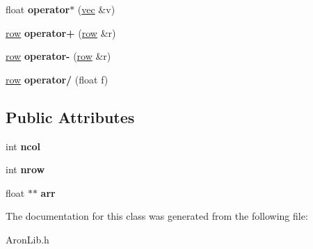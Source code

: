 \begin{DoxyCompactItemize}
\mbox{\label{class_matrix_vector_1_1row_a914ac19994185e97ee1f81e04d7b9f57}} 
float {\bfseries operator$\ast$} (\mbox{\hyperlink{class_matrix_vector_1_1vec}{vec}} \&v)
\item 
\mbox{\label{class_matrix_vector_1_1row_a48b1c08f1e5633f012a90f1165830239}} 
\mbox{\hyperlink{class_matrix_vector_1_1row}{row}} {\bfseries operator+} (\mbox{\hyperlink{class_matrix_vector_1_1row}{row}} \&r)
\item 
\mbox{\label{class_matrix_vector_1_1row_a52e6591a45962217ff4c9aa07d8abff0}} 
\mbox{\hyperlink{class_matrix_vector_1_1row}{row}} {\bfseries operator-\/} (\mbox{\hyperlink{class_matrix_vector_1_1row}{row}} \&r)
\item 
\mbox{\label{class_matrix_vector_1_1row_acb782a00f3402ab648206e27605f6ff2}} 
\mbox{\hyperlink{class_matrix_vector_1_1row}{row}} {\bfseries operator/} (float f)
\end{DoxyCompactItemize}
\subsection*{Public Attributes}
\begin{DoxyCompactItemize}
\item 
\mbox{\label{class_matrix_vector_1_1row_afee52d0d3ef890b29f1e44f51cd71eca}} 
int {\bfseries ncol}
\item 
\mbox{\label{class_matrix_vector_1_1row_a999bc8b53ca12fa416f13aecb7d7e5a0}} 
int {\bfseries nrow}
\item 
\mbox{\label{class_matrix_vector_1_1row_af5d001ccb56241b693cd3d1cdf27992c}} 
float $\ast$$\ast$ {\bfseries arr}
\end{DoxyCompactItemize}


The documentation for this class was generated from the following file\+:\begin{DoxyCompactItemize}
\item 
Aron\+Lib.\+h\end{DoxyCompactItemize}
